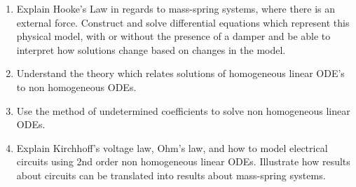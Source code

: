 
\begin{enumerate}
	\item Explain Hooke's Law in regards to mass-spring systems, where there is an external force. Construct and solve differential equations which represent this physical model, with or without the presence of a damper and be able to interpret how solutions change based on changes in the model. 
	\item Understand the theory which relates solutions of homogeneous linear ODE's to non homogeneous ODEs. 
	\item Use the method of undetermined coefficients  to solve non homogeneous linear ODEs.
	\item Explain Kirchhoff's voltage law, Ohm's law, and how to model electrical circuits using 2nd order non homogeneous linear ODEs.  Illustrate how results about circuits can be translated into results about mass-spring systems.


\end{enumerate}

